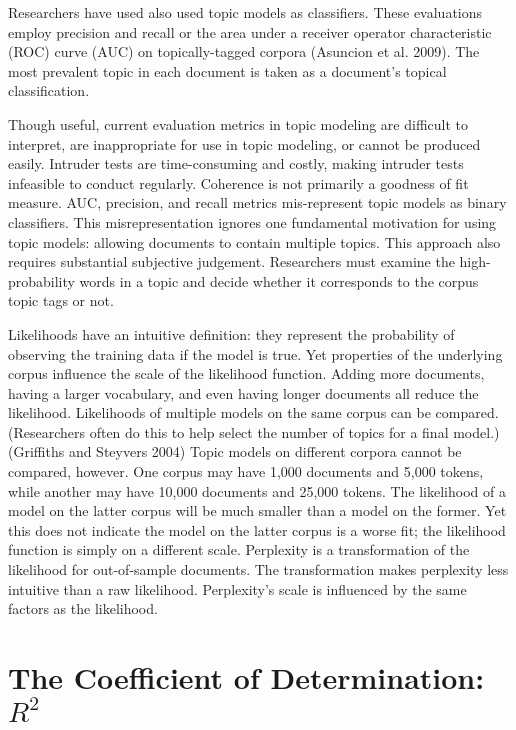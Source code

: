 \documentclass[conference,final,]{IEEEtran}
\begin{document}
Researchers have used also used topic models as classifiers. These
evaluations employ precision and recall or the area under a receiver
operator characteristic (ROC) curve (AUC) on topically-tagged corpora
(Asuncion et al. 2009). The most prevalent topic in each document is
taken as a document's topical classification.

Though useful, current evaluation metrics in topic modeling are
difficult to interpret, are inappropriate for use in topic modeling, or
cannot be produced easily. Intruder tests are time-consuming and costly,
making intruder tests infeasible to conduct regularly. Coherence is not
primarily a goodness of fit measure. AUC, precision, and recall metrics
mis-represent topic models as binary classifiers. This misrepresentation
ignores one fundamental motivation for using topic models: allowing
documents to contain multiple topics. This approach also requires
substantial subjective judgement. Researchers must examine the
high-probability words in a topic and decide whether it corresponds to
the corpus topic tags or not.

Likelihoods have an intuitive definition: they represent the probability
of observing the training data if the model is true. Yet properties of
the underlying corpus influence the scale of the likelihood function.
Adding more documents, having a larger vocabulary, and even having
longer documents all reduce the likelihood. Likelihoods of multiple
models on the same corpus can be compared. (Researchers often do this to
help select the number of topics for a final model.)(Griffiths and
Steyvers 2004) Topic models on different corpora cannot be compared,
however. One corpus may have 1,000 documents and 5,000 tokens, while
another may have 10,000 documents and 25,000 tokens. The likelihood of a
model on the latter corpus will be much smaller than a model on the
former. Yet this does not indicate the model on the latter corpus is a
worse fit; the likelihood function is simply on a different scale.
Perplexity is a transformation of the likelihood for out-of-sample
documents. The transformation makes perplexity less intuitive than a raw
likelihood. Perplexity's scale is influenced by the same factors as the
likelihood.

\hypertarget{the-coefficient-of-determination-r2}{%
\section{\texorpdfstring{The Coefficient of Determination:
\(R^2\)}{The Coefficient of Determination: R\^{}2}}\label{the-coefficient-of-determination-r2}}
\end{document}

